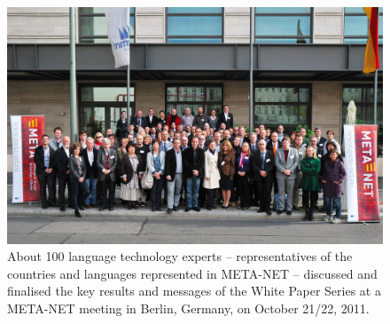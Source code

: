 \documentclass[10pt, plain]{../../metanetpaper}
\begin{document}
\normalsize

\renewcommand*{\figureformat}{}
\renewcommand*{\captionformat}{}

\begin{figure}[h]
  \center
  \includegraphics[width=\textwidth]{../_media/meta-net_team.jpg}
  \caption{About 100 language technology experts -- representatives of the countries and languages represented in META-NET -- discussed and finalised the key results and messages of the White Paper Series at a META-NET meeting in Berlin, Germany, on October 21/22, 2011.}
  \medskip
\end{figure}

\clearpage






% 


\label{sec:acronyms}

\end{document}
